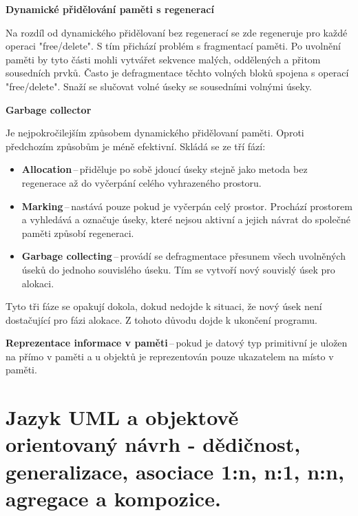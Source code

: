 \begin{Large}\vspace{0,5cm} \textbf{Dynamické přidělování paměti s regenerací}
\end{Large}

 Na rozdíl od dynamického přidělovaní bez regenerací se zde regeneruje pro každé operaci "free/delete". S tím přichází problém s fragmentací paměti. Po uvolnění paměti by tyto části mohli vytvářet sekvence malých, oddělených a přitom sousedních prvků. Často je defragmentace těchto volných bloků spojena s operací "free/delete". Snaží se slučovat volné úseky se sousedními volnými úseky.

\begin{Large}\vspace{0,5cm} \textbf{Garbage collector}
\end{Large}

 Je nejpokročilejším způsobem dynamického přidělovaní paměti. Oproti předchozím způsobům je méně efektivní. 
Skládá se ze tří fází:
\begin{itemize}
    \item \textbf{Allocation}\,--\,přiděluje po sobě jdoucí úseky stejně jako metoda bez regenerace až do vyčerpání celého vyhrazeného prostoru.
    \item\textbf{Marking}\,--\,nastává pouze pokud je vyčerpán celý prostor. Prochází prostorem a vyhledává a označuje úseky, které nejsou aktivní a jejich návrat do společné paměti způsobí regeneraci.
    \item\textbf{Garbage collecting}\,--\,provádí se defragmentace přesunem všech uvolněných úseků do jednoho souvislého úseku. Tím se vytvoří nový souvislý úsek pro alokaci.
\end{itemize}

 Tyto tři fáze se opakují dokola, dokud nedojde k situaci, že nový úsek není dostačující pro fázi alokace. Z tohoto důvodu dojde k ukončení programu.

\vspace{1cm}
\textbf{Reprezentace informace v paměti}\,--\,pokud je datový typ primitivní je uložen na přímo v paměti a u objektů je reprezentován pouze ukazatelem na místo v paměti.







\newpage
\section{Jazyk UML a objektově orientovaný návrh - dědičnost, generalizace, asociace 1:n, n:1, n:n, agregace a kompozice.}

